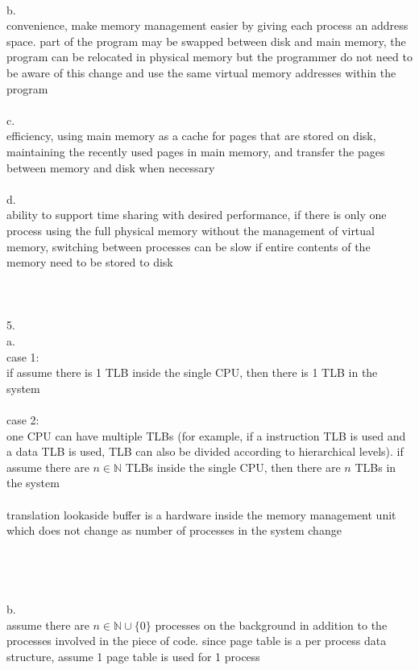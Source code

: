 \documentclass[12pt, border = 4pt, multi]{article} %
\begin{document}
\\
b.\\
convenience, make memory management easier by giving each process an address space. part of the program may be swapped between disk and main memory, the program can be relocated in physical memory but the programmer do not need to be aware of this change and use the same virtual memory addresses within the program\\
\\
c.\\
efficiency, using main memory as a cache for pages that are stored on disk, maintaining the recently used pages in main memory, and transfer the pages between memory and disk when necessary\\
\\
d.\\
ability to support time sharing with desired performance, if there is only one process using the full physical memory without the management of virtual memory, switching between processes can be slow if entire contents of the memory need to be stored to disk\\
\\
\\
\\
5.\\
a.\\
case 1:\\
if assume there is 1 TLB inside the single CPU, then there is 1 TLB in the system\\
\\
case 2:\\
one CPU can have multiple TLBs (for example, if a instruction TLB is used and a data TLB is used, TLB can also be divided according to hierarchical levels). if assume there are $n \in \mathbb{N}$ TLBs inside the single CPU, then there are $n$ TLBs in the system\\
\\
translation lookaside buffer is a hardware inside the memory management unit which does not change as number of processes in the system change\\
\\
\\
\\
\\
b.\\
assume there are $n \in \mathbb{N} \cup \{0\}$ processes on the background in addition to the processes involved in the piece of code. since page table is a per process data structure, assume 1 page table is used for 1 process\\
\end{document}
